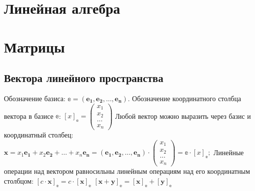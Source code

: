 \section{Линейная алгебра}
\section{Матрицы}
\subsection{Вектора линейного пространства}
Обозначение базиса: $\mathbb{e} = (\boldsymbol{e_1}, \boldsymbol{e_2}, \ldots, \boldsymbol{e_n})$.
Обозначение координатного столбца вектора в базисе $\mathbb{e}$: $[x]_\mathbb{e} =
\begin{pmatrix}
	x_1\\
	x_2\\
	\ldots\\
	x_n
\end{pmatrix} $
Любой вектор можно выразить через базис и координатный столбец:
$\displaystyle
	\boldsymbol{x} = x_1\boldsymbol{e_1} + x_2\boldsymbol{e_2} + \ldots + x_n\boldsymbol{e_n} = (\boldsymbol{e_1}, \boldsymbol{e_2}, \ldots, \boldsymbol{e_n}) \cdot
	\begin{pmatrix}
		x_1\\
		x_2\\
		\ldots\\
		x_n
	\end{pmatrix} = \mathbb{e}\cdot [x]_\mathbb{e};
$
Линейные операции над вектором равносильны линейным операциям над его координатным столбцом:
$\displaystyle [c\cdot \boldsymbol{x}]_\mathbb{e} = c\cdot [\boldsymbol{x}]_\mathbb{e} $
$\displaystyle [\boldsymbol{x} + \boldsymbol{y}]_\mathbb{e} = [\boldsymbol{x}]_\mathbb{e} + [\boldsymbol{y}]_\mathbb{e} $
